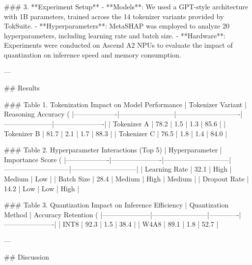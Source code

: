 ### 3. **Experiment Setup**  
- **Models**: We used a GPT-style architecture with 1B parameters, trained across the 14 tokenizer variants provided by TokSuite.  
- **Hyperparameters**: MetaSHAP was employed to analyze 20 hyperparameters, including learning rate and batch size.  
- **Hardware**: Experiments were conducted on Ascend A2 NPUs to evaluate the impact of quantization on inference speed and memory consumption.  

---

## Results  

### Table 1. Tokenization Impact on Model Performance  
| Tokenizer Variant | Reasoning Accuracy (%
|-------------------|------------------------|----------------------------|---------------------|----------------------|  
| Tokenizer A       | 78.2                  | 1.5                        | 1.3                 | 85.6                 |  
| Tokenizer B       | 81.7                  | 2.1                        | 1.7                 | 88.3                 |  
| Tokenizer C       | 76.5                  | 1.8                        | 1.4                 | 84.0                 |  

### Table 2. Hyperparameter Interactions (Top 5)  
| Hyperparameter    | Importance Score (%
|-------------------|----------------------|-----------------------------|-----------------------------|-----------------------------|  
| Learning Rate     | 32.1                | High                        | Medium                      | Low                        |  
| Batch Size        | 28.4                | Medium                      | High                        | Medium                     |  
| Dropout Rate      | 14.2                | Low                         | Low                         | High                       |  

### Table 3. Quantization Impact on Inference Efficiency  
| Quantization Method | Accuracy Retention (%
|---------------------|------------------------|-------------|----------------------|  
| INT8               | 92.3                  | 1.5         | 38.4                |  
| W4A8               | 89.1                  | 1.8         | 52.7                |  

---

## Discussion  

